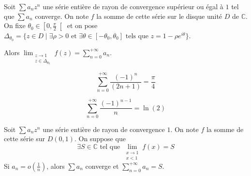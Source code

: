 	\begin{theorem}
		\label{243-1}
		Soit $\sum a_n z^n$ une série entière de rayon de convergence supérieur ou égal à $1$ tel que $\sum a_n$ converge. On note $f$ la somme de cette série sur le disque unité $D$ de $\mathbb{C}$. On fixe $\theta_0 \in \left[ 0, \frac{\pi}{2} \right[$ et on pose $\Delta_{\theta_0} = \{ z \in D \mid \exists \rho > 0 \text{ et } \exists \theta \in [-\theta_0, \theta_0] \text{ tels que } z = 1 - \rho e^{i\theta} \}$.
		\begin{center}
		\end{center}
		Alors $\lim_{\substack{z \rightarrow 1 \\ z \in \Delta_{\theta_0}}} f(z) = \sum_{n=0}^{+\infty} a_n$.
	\end{theorem}
	
	\begin{application}
		\[ \sum_{n=0}^{+\infty} \frac{(-1)^n}{(2n+1)} = \frac{\pi}{4} \]
	\end{application}
	
	\begin{application}
		\[ \sum_{n=0}^{+\infty} \frac{(-1)^{n-1}}{n} = \ln(2) \]
	\end{application}
	
	\begin{theorem}
		Soit $\sum a_n z^n$ une série entière de rayon de convergence $1$. On note $f$ la somme de cette série sur $D(0,1)$. On suppose que
		\[ \exists S \in \mathbb{C} \text{ tel que } \lim_{\substack{x \rightarrow 1 \\ x < 1}} f(x) = S \]
		Si $a_n = o \left( \frac{1}{n} \right)$, alors $\sum a_n$ converge et $\sum_{n=0}^{+\infty} a_n = S$.
	\end{theorem}
	

